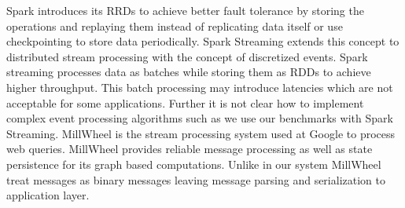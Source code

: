 Spark\cite{zaharia2010spark} introduces its RRDs\cite{zaharia2012resilient} to achieve better fault tolerance by storing the operations and replaying them instead of replicating data itself or use checkpointing to store data periodically. Spark Streaming\cite{zaharia2013discretized} extends this concept to distributed stream processing with the concept of discretized events. Spark streaming\cite{zaharia2013discretized} processes data as batches while storing them as RDDs \cite{zaharia2012resilient} to achieve higher throughput. This batch processing may introduce latencies which are not acceptable for some applications. Further it is not clear how to implement complex event processing algorithms such as we use our benchmarks with Spark Streaming. MillWheel\cite{akidau2013millwheel} is the stream processing system used at Google to process web queries. MillWheel\cite{akidau2013millwheel} provides reliable message processing as well as state persistence for its graph based computations. Unlike in our system 
MillWheel treat messages as binary 
messages leaving message parsing and serialization to application layer. 
